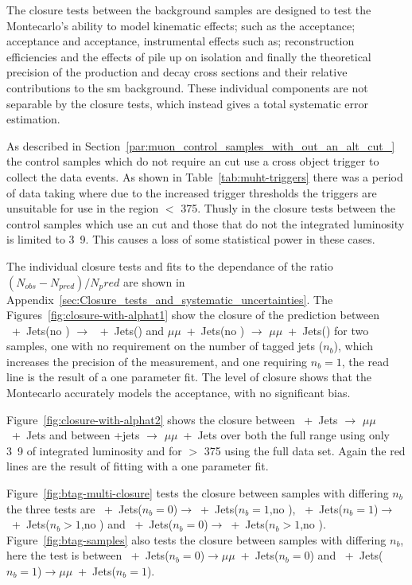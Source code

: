 The closure tests between the background samples are designed to test the 
Montecarlo's ability to model kinematic effects; such as the \alt acceptance; 
\Pmu acceptance and \Pphoton acceptance, instrumental effects such as; 
reconstruction efficiencies and the effects of pile up on isolation and finally 
the theoretical precision of the production and decay cross sections and their 
relative contributions to the \ac{sm} background. These individual components 
are not separable by the closure tests, which instead gives a total systematic 
error estimation.

As described in Section~\ref{par:muon_control_samples_with_out_an_alt_cut_} the 
control samples which do not require an \alt cut use a \muht cross object 
trigger to collect the data events. As shown in Table~\ref{tab:muht-triggers} 
there was a period of data taking where due to the increased trigger thresholds 
the \muht triggers are unsuitable for use in the region \HT $<$ 
\unit{375}{\GeV}. Thusly in the closure tests between the control samples which 
use an \alt cut and those that do not the integrated luminosity is limited to 
\unit{3.9}{\invfb}. This causes a loss of some statistical power in these cases.

The individual closure tests and fits to the \HT dependance of the ratio 
$\left(N_{obs} - N_{pred}\right)/N_pred$ are shown in 
Appendix~\ref{sec:Closure_tests_and_systematic_uncertainties}.
The Figures~\ref{fig:closure-with-alphat1} show the closure of the prediction 
between \Pmu~+~Jets(no \alt) $\rightarrow$ \Pmu~+~Jets(\altg) and $\mu\mu$~+~Jets(no \alt) $\rightarrow$ 
$\mu\mu$~+~Jets(\altg) for two samples, one with no requirement on the number of \Pbottom 
tagged jets ($n_{b}$), which increases the precision of the measurement, and 
one requiring $n_{b} = 1$, the read line is the result of a one parameter fit. 
The level of closure shows that the Montecarlo accurately models the \alt 
acceptance, with no significant bias.

Figure~\ref{fig:closure-with-alphat2} shows the closure between \Pmu~+~Jets 
$\rightarrow$ $\mu\mu$~+~Jets and between \Pphoton+jets $\rightarrow$ $\mu\mu$~+~Jets over both the 
full \HT range using only \unit{3.9}{\invfb} of integrated luminosity and for 
\HT $>$ \unit{375}{\GeV} using the full data set. Again the red lines are the 
result of fitting with a one parameter fit.

Figure~\ref{fig:btag-multi-closure} tests the closure between samples with 
differing $n_{b}$ the three tests are \Pmu~+~Jets($n_b = 0$)$\rightarrow$\Pmu~+~Jets($n_b = 
1$,no \alt), \Pmu~+~Jets($n_b = 1$)$\rightarrow$\Pmu~+~Jets($n_b > 1$,no \alt) and \Pmu~+~Jets($n_b = 
0$)$\rightarrow$\Pmu~+~Jets($n_b > 1$,no \alt). Figure~\ref{fig:btag-samples} also 
tests the closure between samples with differing $n_{b}$, here the test is 
between \Pmu~+~Jets($n_b = 0$)$\rightarrow$$\mu\mu$~+~Jets($n_b = 0$) and \Pmu~+~Jets($n_b =  
1$)$\rightarrow$$\mu\mu$~+~Jets($n_b = 1$).

